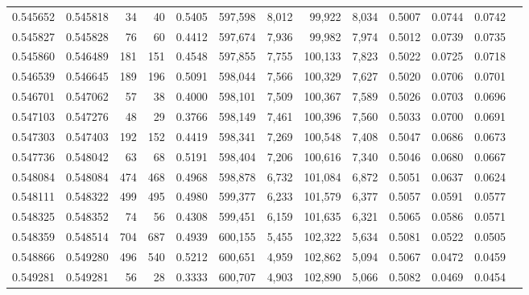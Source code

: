 \begin{tabular}{rrrrrrrrrrrrr}
0.545652 & 0.545818 &    34 &    40 &                                     0.5405 & 597,598 &   8,012 &  99,922 &   8,034 & 0.5007 & 0.0744 & 0.0742 \\
0.545827 & 0.545828 &    76 &    60 &                                     0.4412 & 597,674 &   7,936 &  99,982 &   7,974 & 0.5012 & 0.0739 & 0.0735 \\
0.545860 & 0.546489 &   181 &   151 &                                     0.4548 & 597,855 &   7,755 & 100,133 &   7,823 & 0.5022 & 0.0725 & 0.0718 \\
0.546539 & 0.546645 &   189 &   196 &                                     0.5091 & 598,044 &   7,566 & 100,329 &   7,627 & 0.5020 & 0.0706 & 0.0701 \\
0.546701 & 0.547062 &    57 &    38 &                                     0.4000 & 598,101 &   7,509 & 100,367 &   7,589 & 0.5026 & 0.0703 & 0.0696 \\
0.547103 & 0.547276 &    48 &    29 &                                     0.3766 & 598,149 &   7,461 & 100,396 &   7,560 & 0.5033 & 0.0700 & 0.0691 \\
0.547303 & 0.547403 &   192 &   152 &                                     0.4419 & 598,341 &   7,269 & 100,548 &   7,408 & 0.5047 & 0.0686 & 0.0673 \\
0.547736 & 0.548042 &    63 &    68 &                                     0.5191 & 598,404 &   7,206 & 100,616 &   7,340 & 0.5046 & 0.0680 & 0.0667 \\
0.548084 & 0.548084 &   474 &   468 &                                     0.4968 & 598,878 &   6,732 & 101,084 &   6,872 & 0.5051 & 0.0637 & 0.0624 \\
0.548111 & 0.548322 &   499 &   495 &                                     0.4980 & 599,377 &   6,233 & 101,579 &   6,377 & 0.5057 & 0.0591 & 0.0577 \\
0.548325 & 0.548352 &    74 &    56 &                                     0.4308 & 599,451 &   6,159 & 101,635 &   6,321 & 0.5065 & 0.0586 & 0.0571 \\
0.548359 & 0.548514 &   704 &   687 &                                     0.4939 & 600,155 &   5,455 & 102,322 &   5,634 & 0.5081 & 0.0522 & 0.0505 \\
0.548866 & 0.549280 &   496 &   540 &                                     0.5212 & 600,651 &   4,959 & 102,862 &   5,094 & 0.5067 & 0.0472 & 0.0459 \\
0.549281 & 0.549281 &    56 &    28 &                                     0.3333 & 600,707 &   4,903 & 102,890 &   5,066 & 0.5082 & 0.0469 & 0.0454 \\

\end{tabular}
